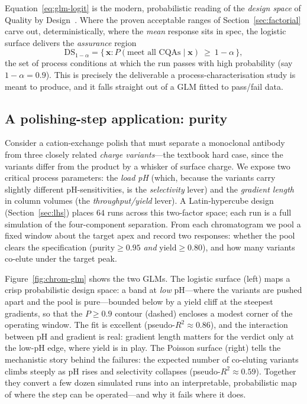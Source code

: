 Equation~\eqref{eq:glm-logit} is the modern, probabilistic reading of the
\emph{design space} of Quality by Design~\cite{ich}. Where the proven acceptable
ranges of Section~\ref{sec:factorial} carve out, deterministically, where the
\emph{mean} response sits in spec, the logistic surface delivers the
\emph{assurance} region
%
\begin{equation}
\mathrm{DS}_{1-\alpha}
  = \bigl\{\,\bm x : P(\text{meet all CQAs}\mid\bm x)\ \ge\ 1-\alpha\,\bigr\},
\label{eq:design-space}
\end{equation}
%
the set of process conditions at which the run passes with high probability (say
$1-\alpha=0.9$). This is precisely the deliverable a process-characterisation
study is meant to produce, and it falls straight out of a GLM fitted to pass/fail
data.

\subsection{A polishing-step application: purity}
\label{sec:glm-polish}

Consider a cation-exchange polish that must separate a monoclonal antibody from
three closely related \emph{charge variants}---the textbook hard case, since the
variants differ from the product by a whisker of surface charge. We expose two
critical process parameters: the \emph{load pH} (which, because the variants
carry slightly different pH-sensitivities, is the \emph{selectivity} lever) and
the \emph{gradient length} in column volumes (the \emph{throughput/yield} lever).
A Latin-hypercube design (Section~\ref{sec:lhs}) places $64$ runs across this
two-factor space; each run is a full  simulation of the
four-component separation. From each chromatogram we pool a fixed window about
the target apex and record two responses: whether the pool clears the
specification ($\text{purity}\ge0.95$ \emph{and} $\text{yield}\ge0.80$), and how
many variants co-elute under the target peak.

Figure~\ref{fig:chrom-glm} shows the two GLMs. The logistic surface (left) maps a
crisp probabilistic design space: a band at \emph{low} pH---where the variants are
pushed apart and the pool is pure---bounded below by a yield cliff at the steepest
gradients, so that the $P\ge0.9$ contour (dashed) encloses a modest corner of the
operating window. The fit is excellent (pseudo-$R^2\approx0.86$), and the
interaction between pH and gradient is real: gradient length matters for the
verdict only at the low-pH edge, where yield is in play. The Poisson surface
(right) tells the mechanistic story behind the failures: the expected number of
co-eluting variants climbs steeply as pH rises and selectivity collapses
(pseudo-$R^2\approx0.59$). Together they convert a few dozen simulated runs into
an interpretable, probabilistic map of where the step can be operated---and why it
fails where it does.

